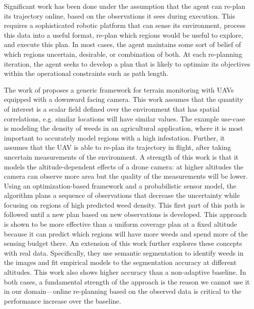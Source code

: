 Significant work has been done under the assumption that the agent can re-plan its trajectory online, based on the observations it sees during execution. This requires a sophisticated robotic platform that can sense its environment, process this data into a useful format, re-plan which regions would be useful to explore, and execute this plan. In most cases, the agent maintains some sort of belief of which regions uncertain, desirable, or combination of both. At each re-planning iteration, the agent seeks to develop a plan that is likely to optimize its objectives within the operational constraints such as path length.

The work of \cite{Popovic2020} proposes a generic framework for terrain monitoring with UAVs equipped with a downward facing camera. This work assumes that the quantity of interest is a scalar field defined over the environment that has spatial correlations, e.g. similar locations will have similar values. The example use-case is modeling the density of weeds in an agricultural application, where it is most important to accurately model regions with a high infestation. Further, it assumes that the UAV is able to re-plan its trajectory in flight, after taking uncertain measurements of the environment. A strength of this work is that it models the altitude-dependent effects of a drone camera: at higher altitudes the camera can observe more area but the quality of the measurements will be lower. Using an optimization-based framework and a probabilistic sensor model, the algorithm plans a sequence of observations that decrease the uncertainty while focusing on regions of high predicted weed density. This first part of this path is followed until a new plan based on new observations is developed. This approach is shown to be more effective than a uniform coverage plan at a fixed altitude because it can predict which regions will have more weeds and spend more of the sensing budget there. An extension of this work \cite{Stache2021AdaptiveSegmentation} further explores these concepts with real data. Specifically, they use semantic segmentation to identify weeds in the images and fit empirical models to the segmentation accuracy at different altitudes. This work also shows higher accuracy than a non-adaptive baseline. In both cases, a fundamental strength of the approach is the reason we cannot use it in our domain---online re-planning based on the observed data is critical to the performance increase over the baseline.

